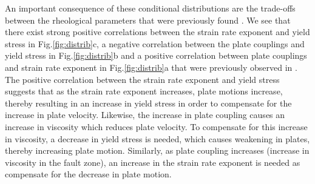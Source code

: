 \documentclass[12pt]{article}
\begin{document}
An important consequence of these conditional distributions are the trade-offs between the rheological parameters that were previously found \citep{ratnaswamy2015adjoint}. We see that there exist strong positive correlations between the strain rate exponent and yield stress in Fig.\ref{fig:distrib}c, a negative correlation between the plate couplings and yield stress in Fig.\ref{fig:distrib}b and a positive correlation between plate couplings and strain rate exponent in Fig.\ref{fig:distrib}a that were previously observed in \citep{ratnaswamy2015adjoint}. The positive correlation between the strain rate exponent and yield stress suggests that as the strain rate exponent increases, plate motions increase, thereby resulting in an increase in yield stress in order to compensate for the increase in plate velocity. Likewise, the increase in plate coupling causes an increase in viscosity which reduces plate velocity.  To compensate for this increase in viscosity, a decrease in yield stress is needed, which causes weakening in plates, thereby increasing plate motion. Similarly, as plate coupling increases (increase in viscosity in the fault zone), an increase in the strain rate exponent is needed as compensate for the decrease in plate motion.  
\end{document}
